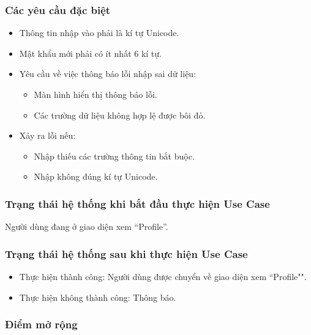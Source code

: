 \subsubsection{Các yêu cầu đặc biệt}
\begin{itemize}
  \item Thông tin nhập vào phải là kí tự Unicode.
  \item Mật khẩu mới phải có ít nhất 6 kí tự.
  \item Yêu cầu về việc thông báo lỗi nhập sai dữ liệu:
    \begin{itemize}
      \item Màn hình hiển thị thông báo lỗi.
      \item Các trường dữ liệu không hợp lệ được bôi đỏ.
    \end{itemize}
  \item Xảy ra lỗi nếu:
    \begin{itemize}
      \item Nhập thiếu các trường thông tin bắt buộc.
      \item Nhập không đúng kí tự Unicode.
    \end{itemize}
\end{itemize}

\subsubsection{Trạng thái hệ thống khi bắt đầu thực hiện Use Case}
Người dùng đang ở giao diện xem ``Profile''.

\subsubsection{Trạng thái hệ thống sau khi thực hiện Use Case}
\begin{itemize}
  \item Thực hiện thành công: Người dùng được chuyển về giao diện xem ``Profile"".
  \item Thực hiện không thành công: Thông báo.
\end{itemize}

\subsubsection{Điểm mở rộng}
